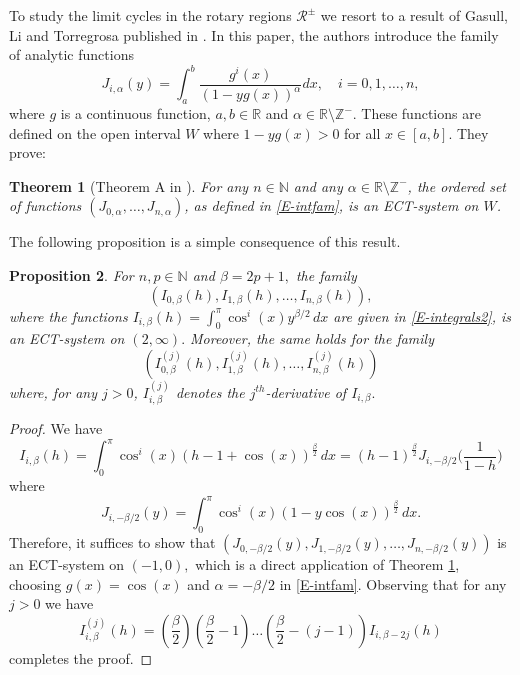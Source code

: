 \documentclass[12pt,psamsfonts]{amsart}
\newtheorem {theorem}{Theorem}[section]
\newtheorem {proposition} [theorem]{Proposition}
\begin{document}
To study the limit cycles in the rotary regions $\mathcal{R}^\pm$ we
resort to a result  of Gasull, Li and Torregrosa published in
\cite{Gasull2012b}. In this paper,  the authors introduce the family
of analytic functions
\begin{equation}
\label{E-intfam}
    J_{i,\alpha}(y)=\int_a^b{\frac{g^i(x)}{(1-yg(x))^{\alpha}}dx},\quad i=0,1,\ldots,n,
\end{equation}
where  $g$ is a continuous function, $a,b\in{\mathbb{R}}$ and $\alpha \in {\mathbb{R}}\setminus {\mathbb{Z}}^-$. These functions
are defined on the open interval $W$ where $1-yg(x)>0$ for all $x\in[a,b]$. They prove:
\begin{theorem}[Theorem A in \cite{Gasull2012b}]
\label{T-THM2} For any $n\in{\mathbb{N}}$ and any $\alpha \in  {\mathbb{R}}\setminus
{\mathbb{Z}}^-$, the ordered set of functions $(J_{0,\alpha},\dots,
J_{n,\alpha})$, as defined in \eqref{E-intfam}, is an ECT-system on
$W$.
\end{theorem}

The following proposition is a simple consequence of this result.

\begin{proposition}
\label{P-pre} For $n,p\in {\mathbb{N}}$ and $\beta=2p+1,$ the family
$$(I_{0,\beta}(h), I_{1,\beta}(h),\ldots, I_{n,\beta}(h)),$$ where the
functions $I_{i,\beta}(h)=\int_{0}^\pi\cos^i(x)y^{\beta/2}\, dx$ are
given in \eqref{E-integrals2}, is an ECT-system on $(2,\infty).$
Moreover,
 the same holds for the family \[(I^{(j)}_{0,\beta}(h),
I^{(j)}_{1,\beta}(h),\ldots, I^{(j)}_{n,\beta}(h))\] where, for any
$j>0$, $I^{(j)}_{i,\beta}$ denotes the $j^{th}$-derivative of
$I_{i,\beta}.$
\end{proposition}
\begin{proof}
 We have
$$I_{i,\beta}(h)=\int_{0}^{\pi}\cos^i(x)\left(h-1+\cos(x)\right)^{\frac
{\beta} 2} \, dx=(h-1)^\frac{\beta}2 J_{i,-\beta/2}\Big(\frac 1
{1-h}\Big)$$ where
$$J_{i,-\beta/2}(y)=\int_0^{\pi}\cos^i(x)\left (1-y\cos(x)\right)^{\frac{\beta}2} \, dx.$$
Therefore, it suffices to show that $(J_{0,-\beta/2}(y), J_{1,-\beta/2}(y),\ldots,
J_{n,-\beta/2}(y))$ is an ECT-system on $(-1,0),$ which is a direct application of Theorem
\ref{T-THM2}, choosing
 $g(x)=\cos(x)$ and $\alpha =-\beta/2$ in \eqref{E-intfam}.
Observing that for any $j>0$ we have
$$I^{(j)}_{i,\beta}(h)=\left(\frac{\beta}{2}\right)\left(\frac{\beta}{2}-1\right)\ldots
\left(\frac{\beta}{2}-(j-1)\right)I_{i,\beta-2j}(h)$$ completes the
proof.
\end{proof}
\end{document}
